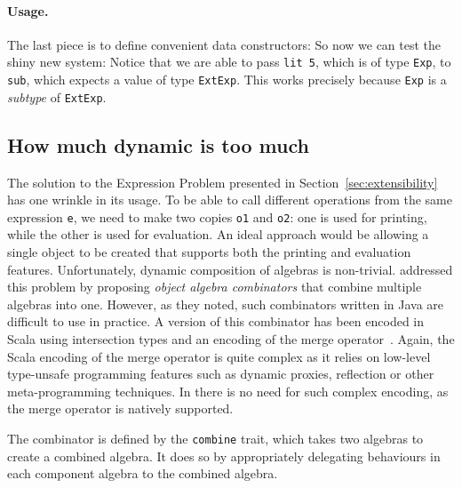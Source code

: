 \paragraph{Usage.} The last piece is to define convenient data constructors:
So now we can test the shiny new system:
Notice that we are able to pass \lstinline{lit 5}, which is of type
\lstinline{Exp}, to \lstinline{sub}, which expects a value of type
\lstinline{ExtExp}. This works precisely because \lstinline{Exp} is a
\textit{subtype} of \lstinline{ExtExp}.



\subsection{How much dynamic is too much}
\label{sec:dynamic}



The solution to the Expression Problem presented in
Section~\ref{sec:extensibility} has one wrinkle in its usage. To be able to call
different operations from the same expression \lstinline{e}, we need to make two
copies \lstinline{o1} and \lstinline{o2}: one is used for printing, while the
other is used for evaluation. An ideal approach would be allowing a single object
to be created that supports both the printing and evaluation features.
Unfortunately, dynamic composition of algebras is non-trivial.
\citet{oliveira2012extensibility} addressed this problem by proposing
\textit{object algebra combinators} that combine multiple algebras into one.
However, as they noted, such combinators written in Java are difficult to use in
practice. A version of this combinator has been encoded in Scala using
intersection types and an encoding of the merge
operator~\cite{oliveira2013feature, rendel14attributes}. Again, the Scala
encoding of the merge operator is quite complex as it relies on low-level
type-unsafe programming features such as dynamic proxies, reflection or other
meta-programming techniques. In \name there is no need for such complex
encoding, as the merge operator is natively supported.

The combinator is defined by the \lstinline{combine} trait, which takes two
algebras to create a combined algebra. It does so by appropriately delegating
behaviours in each component algebra to the combined algebra.

